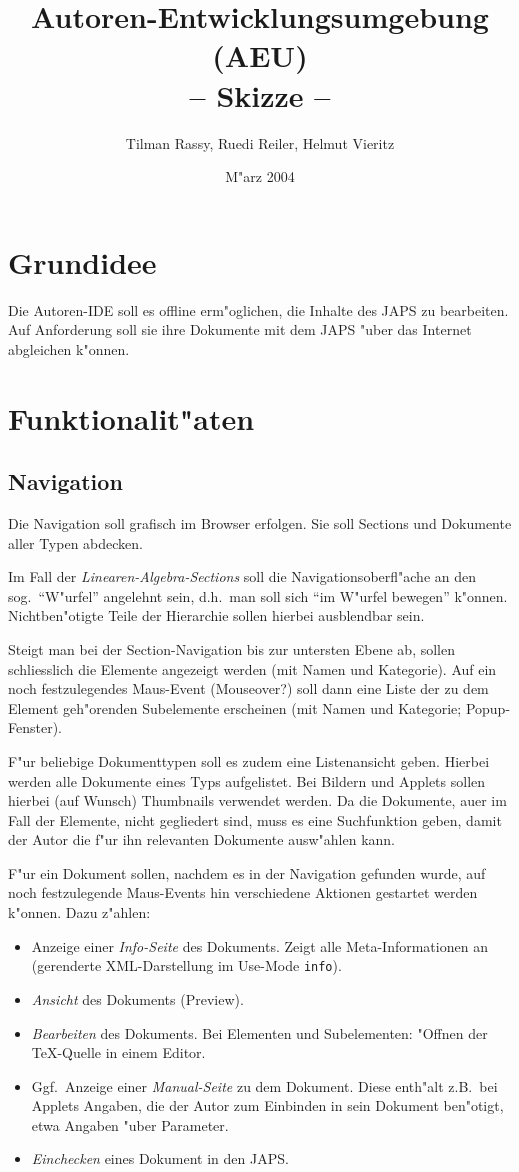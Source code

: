 \documentclass[a4paper,12pt]{article}
\title{Autoren-Entwicklungsumgebung (AEU) \\ -- Skizze --}
\author{Tilman Rassy, Ruedi Reiler, Helmut Vieritz}
\date{M"arz 2004}
\newcommand{\code}[1]{\texttt{#1}}
\begin{document}
\maketitle

\section{Grundidee}
Die Autoren-IDE soll es offline erm"oglichen, die Inhalte des JAPS zu bearbeiten. Auf
Anforderung soll sie ihre Dokumente mit dem JAPS "uber das Internet abgleichen k"onnen.

\section{Funktionalit"aten}

\subsection{Navigation}

Die Navigation soll grafisch im Browser erfolgen. Sie soll Sections und Dokumente aller
Typen abdecken.

Im Fall der \emph{Linearen-Algebra-Sections} soll die Navigationsoberfl"ache an den
sog.\ "`W"urfel"' angelehnt sein, d.h.\ man soll sich "`im W"urfel bewegen"' k"onnen.
Nichtben"otigte Teile der Hierarchie sollen hierbei ausblendbar sein.

Steigt man bei der Section-Navigation bis zur untersten Ebene ab, sollen schliesslich die
Elemente angezeigt werden (mit Namen und Kategorie). Auf ein noch festzulegendes Maus-Event
(Mouseover?) soll dann eine Liste der zu dem Element geh"orenden Subelemente erscheinen (mit
Namen und Kategorie; Popup-Fenster). 

F"ur beliebige Dokumenttypen soll es zudem eine Listenansicht geben. Hierbei werden alle
Dokumente eines Typs aufgelistet. Bei Bildern und Applets sollen hierbei (auf Wunsch)
Thumbnails verwendet werden. Da die Dokumente, au\3er im Fall der Elemente, nicht
gegliedert sind, muss es eine Suchfunktion geben, damit der Autor die f"ur ihn relevanten
Dokumente ausw"ahlen kann.

F"ur ein Dokument sollen, nachdem es in der Navigation gefunden wurde, auf noch
festzulegende Maus-Events hin verschiedene Aktionen gestartet werden k"onnen. Dazu z"ahlen:
\begin{itemize}
\item Anzeige einer \emph{Info-Seite} des Dokuments. Zeigt alle Meta-Informationen an
  (gerenderte XML-Darstellung im Use-Mode \code{info}).
\item \emph{Ansicht} des Dokuments (Preview).
\item \emph{Bearbeiten} des Dokuments. Bei Elementen und Subelementen: "Offnen der
  TeX-Quelle in einem Editor.
\item Ggf.\ Anzeige einer \emph{Manual-Seite} zu dem Dokument. Diese enth"alt z.B.\ bei
  Applets Angaben, die der Autor zum Einbinden in sein Dokument ben"otigt, etwa Angaben
  "uber Parameter.
\item \emph{Einchecken} eines Dokument in den JAPS.
\end{itemize}
\end{document}
